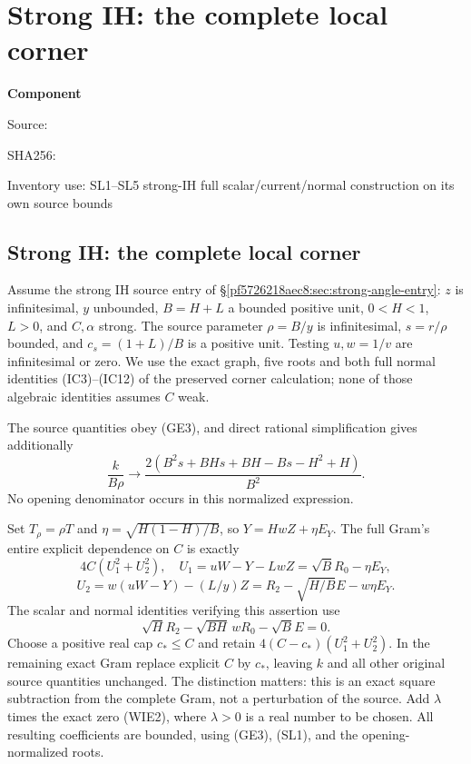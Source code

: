 \chapter{Strong IH: the complete local corner}
\label{component:pf3e0ca8bf054}
\noindent\textbf{Component }\par
{\small\noindent Source: \par}
{\small\noindent SHA256: \par}
{\small\noindent Inventory use: SL1--SL5 strong-IH full scalar/current/normal construction on its own source bounds\par}
\medskip
\section{Strong IH: the complete local corner}
\label{pf3e0ca8bf054:sec:strong-ih-local}
Assume the strong IH source entry of \S\ref{pf5726218aec8:sec:strong-angle-entry}:
$z$ is infinitesimal, $y$ unbounded, $B=H+L$ a bounded positive unit,
$0<H<1$, $L>0$, and $C,\alpha$ strong. The source parameter
$\rho=B/y$ is infinitesimal, $s=r/\rho$ bounded, and $c_s=(1+L)/B$
is a positive unit. Testing $u,w=1/v$ are infinitesimal or zero.
We use the exact graph, five roots and both full normal identities
(IC3)--(IC12) of the preserved corner calculation; none of those
algebraic identities assumes $C$ weak.

The source quantities obey (GE3), and direct rational simplification
gives additionally
\[
 \frac{k}{B\rho}\longrightarrow
 \frac{2(B^2s+BHs+BH-Bs-H^2+H)}{B^2}.
\tag{SL1}
\]
No opening denominator occurs in this normalized expression.

Set $T_\rho=\rho T$ and
$\eta=\sqrt{H(1-H)/B}$, so $Y=HwZ+\eta E_Y$.
The full Gram's entire explicit dependence on $C$ is exactly
\[
 4C(U_1^2+U_2^2),\quad
 U_1=uW-Y-LwZ=\sqrt B R_0-\eta E_Y,
\]
\[
 U_2=w(uW-Y)-(L/y)Z
       =R_2-\sqrt{H/B}E-w\eta E_Y.
\tag{SL2}
\]
The scalar and normal identities verifying this assertion use
\[
 \sqrt H R_2-\sqrt{BH}\,wR_0-\sqrt B E=0.
\tag{SL3}
\]
Choose a positive real cap $c_*\le C$ and retain
$4(C-c_*)(U_1^2+U_2^2)$. In the remaining exact Gram replace explicit
$C$ by $c_*$, leaving $k$ and all other original source quantities
unchanged. The distinction matters: this is an exact square
subtraction from the complete Gram, not a perturbation of the source.
Add $\lambda$ times the exact zero (WIE2), where $\lambda>0$ is a
real number to be chosen. All resulting coefficients are bounded,
using (GE3), (SL1), and the opening-normalized roots.

